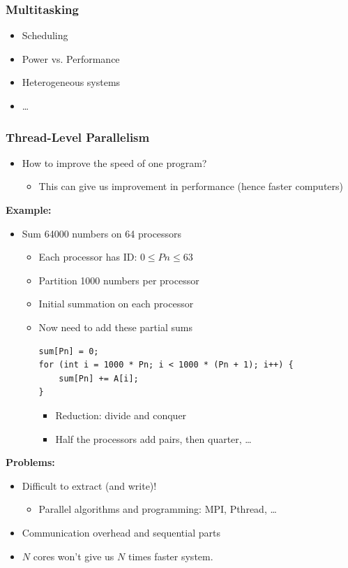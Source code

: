 \documentclass[10pt]{article}
\newcommand{\example}{\textbf{Example:}}
\begin{document}
\subsubsection*{Multitasking}
\begin{itemize}
    \item Scheduling
    \item Power vs. Performance
    \item Heterogeneous systems
    \item \dots
\end{itemize}

\subsubsection*{Thread-Level Parallelism}
\begin{itemize}
    \item How to improve the speed of one program?
    \begin{itemize}
        \item This can give us improvement in performance (hence faster computers)
    \end{itemize}
\end{itemize}
\example\\
\begin{itemize}
    \item Sum 64000 numbers on 64 processors
    \begin{itemize}
        \item Each processor has ID: $0 \leq Pn \leq 63$
        \item Partition 1000 numbers per processor
        \item Initial summation on each processor
        \item Now need to add these partial sums
        \begin{verbatim}
sum[Pn] = 0;
for (int i = 1000 * Pn; i < 1000 * (Pn + 1); i++) {
    sum[Pn] += A[i];
}
        \end{verbatim}
        \begin{itemize}
            \item Reduction: divide and conquer
            \item Half the processors add pairs, then quarter, \dots
        \end{itemize}
    \end{itemize}
\end{itemize}
\textbf{Problems:}
\begin{itemize}
    \item Difficult to extract (and write)!
    \begin{itemize}
        \item Parallel algorithms and programming: MPI, Pthread, \dots
    \end{itemize}
    \item Communication overhead and sequential parts
    \item $N$ cores won't give us $N$ times faster system.
\end{itemize}
\end{document}
